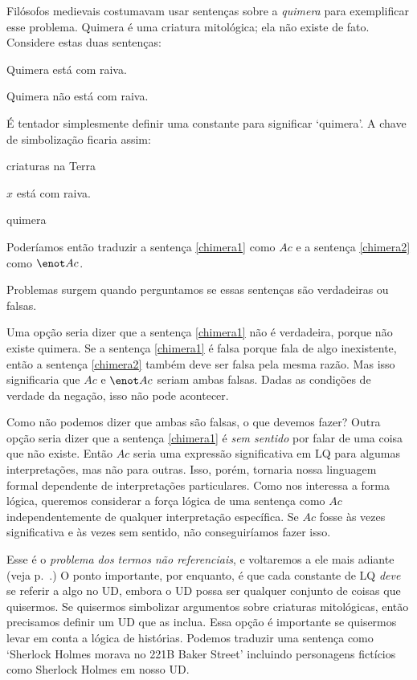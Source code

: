 Filósofos medievais costumavam usar sentenças sobre a \emph{quimera} para exemplificar esse problema. Quimera é uma criatura mitológica; ela não existe de fato. Considere estas duas sentenças:
\begin{earg}
\item[\ex{chimera1}] Quimera está com raiva.
\item[\ex{chimera2}] Quimera não está com raiva.
\end{earg}
É tentador simplesmente definir uma constante para significar `quimera'. A chave de simbolização ficaria assim:
\begin{ekey}
\item[UD:] criaturas na Terra
\item[Ax:] $x$ está com raiva.
\item[c:] quimera
\end{ekey}
Poderíamos então traduzir a sentença \ref{chimera1} como $Ac$ e a sentença \ref{chimera2} como $\enot Ac$.

Problemas surgem quando perguntamos se essas sentenças são verdadeiras ou falsas.

Uma opção seria dizer que a sentença \ref{chimera1} não é verdadeira, porque não existe quimera. Se a sentença \ref{chimera1} é falsa porque fala de algo inexistente, então a sentença \ref{chimera2} também deve ser falsa pela mesma razão. Mas isso significaria que $Ac$ e $\enot Ac$ seriam ambas falsas. Dadas as condições de verdade da negação, isso não pode acontecer.

Como não podemos dizer que ambas são falsas, o que devemos fazer? Outra opção seria dizer que a sentença \ref{chimera1} é \emph{sem sentido} por falar de uma coisa que não existe. Então $Ac$ seria uma expressão significativa em LQ para algumas interpretações, mas não para outras. Isso, porém, tornaria nossa linguagem formal dependente de interpretações particulares. Como nos interessa a forma lógica, queremos considerar a força lógica de uma sentença como $Ac$ independentemente de qualquer interpretação específica. Se $Ac$ fosse às vezes significativa e às vezes sem sentido, não conseguiríamos fazer isso.

Esse é o \emph{problema dos termos não referenciais}, e voltaremos a ele mais adiante (veja p.~\pageref{subsec.defdesc}.) O ponto importante, por enquanto, é que cada constante de LQ \emph{deve} se referir a algo no UD, embora o UD possa ser qualquer conjunto de coisas que quisermos. Se quisermos simbolizar argumentos sobre criaturas mitológicas, então precisamos definir um UD que as inclua. Essa opção é importante se quisermos levar em conta a lógica de histórias. Podemos traduzir uma sentença como `Sherlock Holmes morava no 221B Baker Street' incluindo personagens fictícios como Sherlock Holmes em nosso UD.


